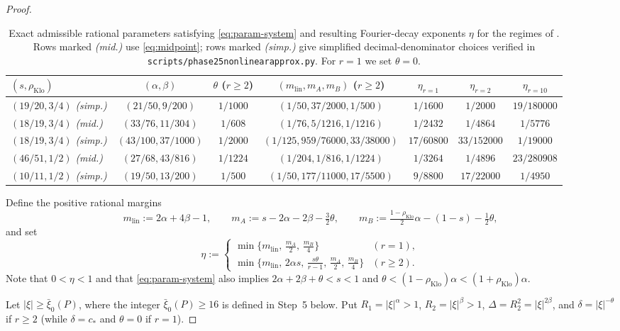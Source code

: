 \documentclass[11pt]{article}
\newcommand{\ttt}[1]{\texttt{\begingroup\def\_{\textunderscore\discretionary{}{}{}}#1\endgroup}}
\newcommand{\rhoK}{\rho_{\mathrm{Klo}}}
\newcommand{\mlin}{m_{\mathrm{lin}}}
\begin{document}
\begin{proof}
\begin{table}[ht]
\centering\footnotesize
\setlength{\tabcolsep}{3pt}
\begin{tabular}{@{}lcccccc@{}}
\toprule
$(s,\rhoK)$ & $(\alpha,\beta)$ & $\theta$ ($r\ge2$) & $(\mlin,m_A,m_B)$ ($r\ge2$) & $\eta_{r=1}$ & $\eta_{r=2}$ & $\eta_{r=10}$ \\
\midrule
$(19/20,3/4)$ \emph{(simp.)} & $(21/50,9/200)$ & $1/1000$ & $(1/50,37/2000,1/500)$ & $1/1600$ & $1/2000$ & $19/180000$ \\
$(18/19,3/4)$ \emph{(mid.)} & $(33/76,11/304)$ & $1/608$ & $(1/76,5/1216,1/1216)$ & $1/2432$ & $1/4864$ & $1/5776$ \\
$(18/19,3/4)$ \emph{(simp.)} & $(43/100,37/1000)$ & $1/2000$ & $(1/125,959/76000,33/38000)$ & $17/60800$ & $33/152000$ & $1/19000$ \\
$(46/51,1/2)$ \emph{(mid.)} & $(27/68,43/816)$ & $1/1224$ & $(1/204,1/816,1/1224)$ & $1/3264$ & $1/4896$ & $23/280908$ \\
$(10/11,1/2)$ \emph{(simp.)} & $(19/50,13/200)$ & $1/500$ & $(1/50,177/11000,17/5500)$ & $9/8800$ & $17/22000$ & $1/4950$ \\
\bottomrule
\end{tabular}
\caption{Exact admissible rational parameters satisfying \eqref{eq:param-system} and resulting Fourier-decay exponents $\eta$ for the regimes of . Rows marked \emph{(mid.)} use \eqref{eq:midpoint}; rows marked \emph{(simp.)} give simplified decimal-denominator choices verified in \ttt{scripts/phase25\_nonlinear\_approx.py}. For $r=1$ we set $\theta=0$.}\label{tab:exponents}
\end{table}

Define the positive rational margins
\[
\mlin:=2\alpha+4\beta-1,\qquad m_A:=s-2\alpha-2\beta-\tfrac32\theta,\qquad m_B:=\tfrac{1-\rhoK}{2}\alpha-(1-s)-\tfrac12\theta,
\]
and set
\[
\eta:=\begin{cases}
\min\!\bigl\{\mlin,\,\frac{m_A}{2},\,\frac{m_B}{4}\bigr\} & (r=1),\\[3pt]
\min\!\bigl\{\mlin,\,2\alpha s,\,\frac{s\theta}{r-1},\,\frac{m_A}{2},\,\frac{m_B}{4}\bigr\} & (r\ge2).
\end{cases}
\]
Note that $0<\eta<1$ and that \eqref{eq:param-system} also implies $2\alpha+2\beta+\theta<s<1$ and $\theta<(1-\rhoK)\alpha<(1+\rhoK)\alpha$.

Let $|\xi|\ge\bar\xi_0(P)$, where the integer $\bar\xi_0(P)\ge16$ is defined in Step~5 below. Put $R_1=|\xi|^\alpha>1$, $R_2=|\xi|^\beta>1$, $\Delta=R_2^2=|\xi|^{2\beta}$, and $\delta=|\xi|^{-\theta}$ if $r\ge2$ (while $\delta=c_*$ and $\theta=0$ if $r=1$).


\end{proof}
\end{document}

